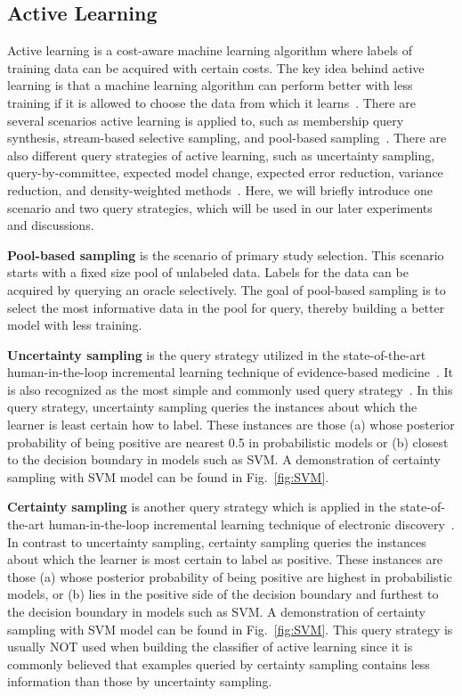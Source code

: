 \documentclass{svjour3}
\theoremstyle{break}
\begin{document}
\subsection{Active Learning}
\label{sect: Active learning}

Active learning is a cost-aware machine learning algorithm where labels of training data can be acquired with certain costs. The key idea behind active learning is that a machine learning algorithm can perform better with less
training if it is allowed to choose the data from which it learns~\cite{settles2012active}. There are several scenarios active learning is applied to, such as membership query synthesis, stream-based selective sampling, and pool-based sampling~\cite{settles2010active}. There are also different query strategies of active learning, such as uncertainty sampling, query-by-committee, expected model change, expected error reduction, variance reduction, and density-weighted methods~\cite{settles2010active}. Here, we will briefly introduce one scenario and two query strategies, which will be used in our later experiments and discussions.

\textbf{Pool-based sampling} is the scenario of primary study selection. This scenario starts with a fixed size pool of unlabeled data. Labels for the data can be acquired by querying an oracle selectively. The goal of pool-based sampling is to select the most informative data in the pool for query, thereby building a better model with less training.

\textbf{Uncertainty sampling} is the query strategy utilized in the state-of-the-art human-in-the-loop incremental learning technique of evidence-based medicine~\cite{wallace2010semi,wallace2010active}. It is also recognized as the most simple and commonly used query strategy~\cite{settles2010active}. In this query strategy, uncertainty sampling queries the instances about which the learner is least certain how to label. These instances are those (a) whose posterior probability of being positive are nearest 0.5 in probabilistic models or (b) closest to the decision boundary in models such as SVM. A demonstration of certainty sampling with SVM model can be found in Fig.~\ref{fig:SVM}.

\textbf{Certainty sampling} is another query strategy which is applied in the state-of-the-art human-in-the-loop incremental learning technique of electronic discovery~\cite{cormack2014evaluation,cormack2015autonomy}. In contrast to uncertainty sampling, certainty sampling queries the instances about which the learner is most certain to label as positive. These instances are those (a) whose posterior probability of being positive are highest in probabilistic models, or (b) lies in the positive side of the decision boundary and furthest to the decision boundary in models such as SVM. A demonstration of certainty sampling with SVM model can be found in Fig.~\ref{fig:SVM}. This query strategy is usually NOT used when building the classifier of active learning since it is commonly believed that examples queried by certainty sampling contains less information than those by uncertainty sampling.
\end{document}
